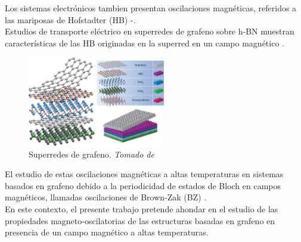 \begin{frame}
	\justifying
	\begin{multicols}{2}
		Los sistemas electrónicos tambien presentan oscilaciones magnéticas,
		referidos a las mariposas de Hofstadter (HB) \cite{Yu2014}-\cite{Yang2016}.\\
		\vspace{0.5cm}
		Estudios de transporte eléctrico en superredes de grafeno sobre h-BN \cite{Yankowitz2012}
		muestran características de las HB originadas en la superred en un campo magnético \cite{BenShalom2016}.
		\begin{figure}
			\includegraphics[width=6cm]{graficas/heterostructures.jpg}
			\caption{Superredes de grafeno. \textit{Tomado de} \cite{Geim2013}}
			\label{heterostructures}
		\end{figure}
	\end{multicols}
\end{frame}

\begin{frame}
	\justifying
	El estudio de estas oscilaciones magnéticas a altas temperaturas en sistemas basados
	en grafeno debido a la periodicidad de estados de Bloch en campos magnéticos,
	llamadas oscilaciones de Brown-Zak (BZ) \cite{Kumar2017}. \\
	\vspace{0.5cm}
	En este contexto, el presente trabajo pretende ahondar en el estudio de las propiedades magneto-oscilatorias
	de las estructuras basadas en grafeno en presencia de un campo magnético a altas temperaturas.

\end{frame}
